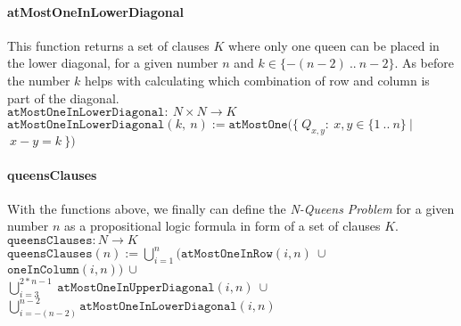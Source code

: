 \paragraph{atMostOneInLowerDiagonal}
This function returns a set of clauses $K$ where only one queen can be placed in the lower diagonal, for a given number $n$ and $k \in \{-(n - 2)\ ..\ n - 2\}$. As before the number $k$ helps with calculating which combination of row and column is part of the diagonal.
\\[0.2cm]
\hspace*{1.3cm} $\texttt{atMostOneInLowerDiagonal}:\ N \times N \to K$
\\[0.2cm]
\hspace*{1.3cm} $\texttt{atMostOneInLowerDiagonal}(k,\ n) := \texttt{atMostOne}(\{\ Q_{x,y} :\ x,y \in \{1\ ..\ n\}\ |$
\hspace*{11.5cm} $\ x - y = k\ \})$

\paragraph{queensClauses}
With the functions above, we finally can define the \textit{N-Queens Problem} for a given number $n$ as a propositional logic formula in form of a set of clauses $K$.
\\[0.2cm]
\hspace*{1.3cm} $\texttt{queensClauses}:  N \to K$
\\[0.2cm]
\hspace*{1.3cm} $\texttt{queensClauses}(n) := \bigcup\limits_{i=1}^{n}(\texttt{atMostOneInRow}(i, n)\ \cup\ $
$\texttt{oneInColumn}(i, n))\ \cup\ $
\\[0.1cm]
\hspace*{6.1cm} $\bigcup\limits_{i=3}^{2 * n - 1}\ \texttt{atMostOneInUpperDiagonal}(i, n)\ \cup\ $
\\[0.1cm]
\hspace*{5.8cm} $\bigcup\limits_{i=-(n - 2)}^{n - 2}\texttt{atMostOneInLowerDiagonal}(i, n)$